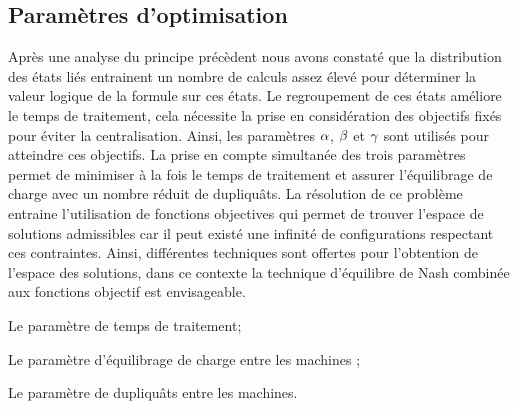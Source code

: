
\subsection{Paramètres d’optimisation}
 
Après une analyse du principe précèdent nous avons constaté que la distribution des états liés entrainent un nombre de calculs assez élevé pour déterminer la valeur logique de la formule sur ces états. Le regroupement de ces états améliore le temps de traitement, cela nécessite la prise en considération des objectifs fixés pour éviter la centralisation. Ainsi, les paramètres $\parametreone{}$, $\parametretwo{}$ et $\parametretree{}$ sont utilisés pour atteindre ces objectifs. La prise en compte simultanée des trois paramètres permet de minimiser à la fois le temps de traitement et assurer l’équilibrage de charge avec un nombre réduit de dupliquâts. La résolution de ce problème entraine l'utilisation de fonctions objectives qui permet de trouver l'espace de solutions admissibles car il peut existé une infinité de configurations respectant ces contraintes. Ainsi, différentes techniques sont offertes pour l'obtention de l'espace des solutions, dans ce contexte la technique d’équilibre de Nash combinée aux fonctions objectif est envisageable.
\begin{description}[leftmargin=*,labelindent=1em]
	\item[$\parametreone{}$] Le paramètre de temps de traitement;
	\item [$\parametretwo{}$] Le paramètre d'équilibrage de charge entre les machines ;
	\item [$\parametretree{}$] Le paramètre de dupliquâts  entre les machines.
\end{description}


